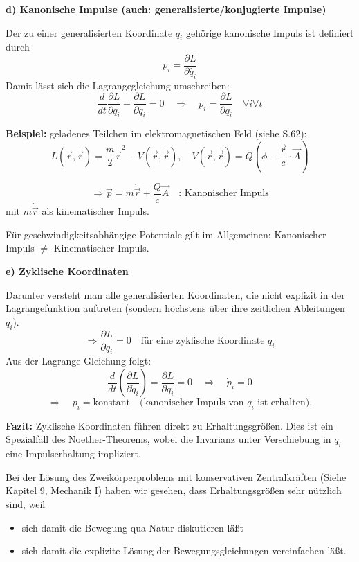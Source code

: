 \documentclass[10pt, letterpaper]{article}
\begin{document}
\textbf*{d) Kanonische Impulse (auch: generalisierte/konjugierte Impulse)}

Der zu einer generalisierten Koordinate $q_i$ gehörige kanonische Impuls ist definiert durch
\[p_i = \frac{\partial L}{\partial \dot{q_i}}\]
Damit lässt sich die Lagrangegleichung umschreiben:
\[\frac{d}{dt}\frac{\partial L}{\partial \dot{q_i}} - \frac{\partial L}{\partial q_i} = 0 \quad \Rightarrow \quad \dot{p_i} = \frac{\partial L}{\partial q_i} \quad \forall i \forall t\]




\textbf{Beispiel:} geladenes Teilchen im elektromagnetischen Feld (siehe S.62):
\[L(\vec{r},\dot{\vec{r}}) = \frac{m}{2}\dot{\vec{r}}^2 - V(\vec{r},\dot{\vec{r}}), \quad V(\vec{r},\dot{\vec{r}}) = Q(\phi - \frac{\dot{\vec{r}}}{c}\cdot\vec{A})\]

\[\Rightarrow \vec{p} = m\dot{\vec{r}} + \frac{Q}{c}\vec{A} \quad \text{: Kanonischer Impuls}\]
mit $m\dot{\vec{r}}$ als kinematischer Impuls. 

Für geschwindigkeitsabhängige Potentiale gilt im Allgemeinen:
Kanonischer Impuls $\neq$ Kinematischer Impuls.





\textbf{e) Zyklische Koordinaten}

Darunter versteht man alle generalisierten Koordinaten, die nicht explizit in der Lagrangefunktion auftreten (sondern höchstens über ihre zeitlichen Ableitungen \( \dot{q}_i \)).
\[
\Rightarrow \frac{\partial L}{\partial q_i} = 0 
\quad \text{für eine zyklische Koordinate } q_i
\]
Aus der Lagrange-Gleichung folgt:
\[
\frac{d}{dt} \left( \frac{\partial L}{\partial \dot{q}_i} \right) = \frac{\partial L}{\partial q_i} = 0
\quad \Rightarrow \quad \dot{p}_i = 0
\]
\[
\Rightarrow \quad p_i = \text{konstant}
\quad \text{(kanonischer Impuls von } q_i \text{ ist erhalten).}
\]

\noindent
\textbf{Fazit:}  
Zyklische Koordinaten führen direkt zu Erhaltungsgrößen. Dies ist ein Spezialfall des Noether-Theorems, wobei die Invarianz unter Verschiebung in \( q_i \) eine Impulserhaltung impliziert.



Bei der Lösung des Zweikörperproblems mit konservativen Zentralkräften (Siehe Kapitel 9, Mechanik I) haben wir gesehen, dass Erhaltungsgrößen sehr nützlich sind, weil
\begin{itemize}
\item sich damit die Bewegung qua Natur diskutieren läßt
\item sich damit die explizite Lösung der Bewegungsgleichungen vereinfachen läßt.
\end{itemize}
\end{document}
